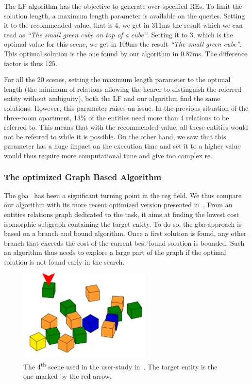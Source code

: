 The LF algorithm has the objective to generate over-specified REs. To limit the solution length, a maximum length parameter is available on the queries. Setting it to the recommended value, that is 4, we get in 311ms the result which we can read as \textit{``The small green cube on top of a cube''}. Setting it to 3, which is the optimal value for this scene, we get in 109ms the result \textit{``The small green cube''}. This optimal solution is the one found by our algorithm in 0.87ms. The difference factor is thus 125.

For all the 20 scenes, setting the maximum length parameter to the optimal length (the minimum of relations allowing the hearer to distinguish the referred entity without ambiguity), both the LF and our algorithm find the same solutions. However, this parameter raises an issue. In the previous situation of the three-room apartment, 13\% of the entities need more than 4 relations to be referred to. This means that with the recommended value, all these entities would not be referred to while it is possible. On the other hand, we saw that this parameter has a huge impact on the execution time and set it to a higher value would thus require more computational time and give too complex \acrshort{re}.

\subsubsection{The optimized Graph Based Algorithm}

The \acrshort{gba}~\cite{viethen_2013_graphs} has been a significant turning point in the \acrshort{reg} field. We thus compare our algorithm with its more recent optimized version presented in~\cite{li_2017_automatically}. From an entities relations graph dedicated to the task, it aims at finding the lowest cost isomorphic subgraph containing the target entity. To do so, the \acrshort{gba} approach is based on a branch and bound algorithm. Once a first solution is found, any other branch that exceeds the cost of the current best-found solution is bounded. Such an algorithm thus needs to explore a large part of the graph if the optimal solution is not found early in the search.

\newpage

\begin{figure}[ht!]
\centering
\includegraphics[scale=0.7]{figures/chapter4/GBA.png}
\caption{\label{fig:chap4_gba} The 4\textsuperscript{th} scene used in the user-study in~\cite{li_2016_spatial}. The target entity is the one marked by the red arrow.}
\end{figure}

